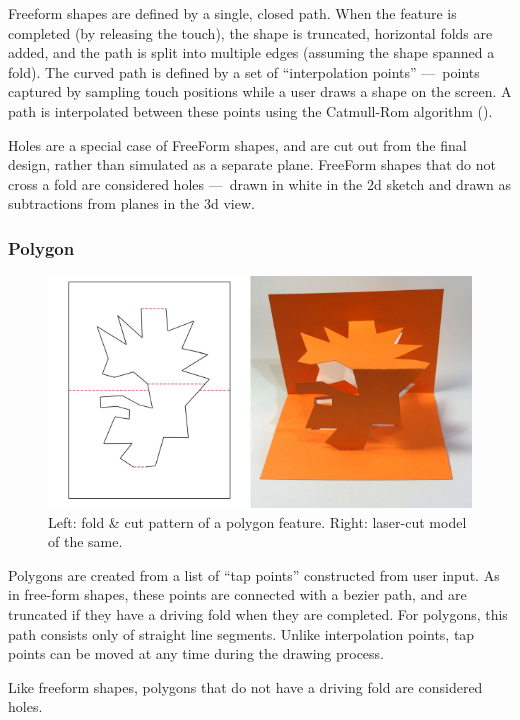 Freeform shapes are defined by a single, closed path. When the feature
is completed (by releasing the touch), the shape is truncated,
horizontal folds are added, and the path is split into multiple edges
(assuming the shape spanned a fold). The curved path is defined by a set
of ``interpolation points'' ---~points captured by sampling touch
positions while a user draws a shape on the screen. A path is
interpolated between these points using the Catmull-Rom algorithm
(\citet{catmull1974class}).

Holes are a special case of FreeForm shapes, and are cut out from the
final design, rather than simulated as a separate plane. FreeForm shapes
that do not cross a fold are considered holes ---~drawn in white in the
2d sketch and drawn as subtractions from planes in the 3d view.

\subsubsection{Polygon}\label{polygon}

\begin{figure}[htbp]
\centering
\includegraphics{figures/33_UI_Interface_Data_Structures/poly.pdf}
\caption{Left: fold \& cut pattern of a polygon feature. Right:
laser-cut model of the same.}
\end{figure}

Polygons are created from a list of ``tap points'' constructed from user
input. As in free-form shapes, these points are connected with a bezier
path, and are truncated if they have a driving fold when they are
completed. For polygons, this path consists only of straight line
segments. Unlike interpolation points, tap points can be moved at any
time during the drawing process.

Like freeform shapes, polygons that do not have a driving fold are
considered holes.

